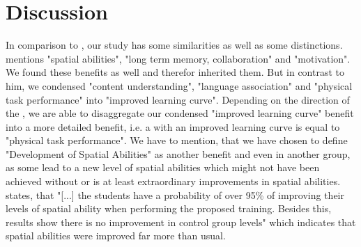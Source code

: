 \section{Discussion}
\label{sec:Discussion}
In comparison to \cite{Radu.2014}, our study has some similarities as well as some distinctions. \cite{Radu.2014} mentions "spatial abilities", "long term memory, collaboration" and "motivation". We found these benefits as well and therefor inherited them. But in contrast to him, we condensed "content understanding", "language association" and "physical task performance" into "improved learning curve". Depending on the direction of the \appns, we are able to disaggregate our condensed "improved learning curve" benefit into a more detailed benefit, i.e. a \ST \app with an improved learning curve is equal to "physical task performance". We have to mention, that we have chosen to define "Development of Spatial Abilities" as another benefit and even in another group, as some \apps lead to a new level of spatial abilities which might not have been achieved without \AR or is at least extraordinary improvements in spatial abilities. \cite{MartinGutierrez.2013} states, that "[...] the students have a probability of over 95\% of improving their levels of spatial ability when performing the proposed training. Besides this, results show there is no improvement in control group levels"\autocite[4]{MartinGutierrez.2013} which indicates that spatial abilities were improved far more than usual. \\

